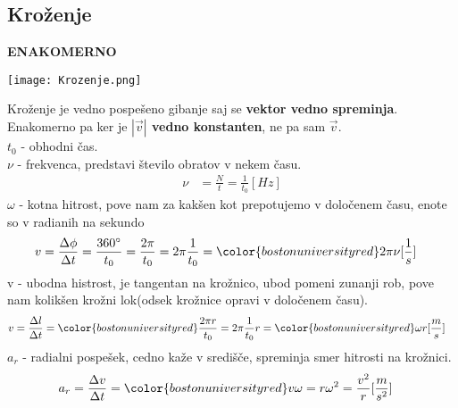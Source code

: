 {\color{indiagreen}\subsection{Kroženje}}
\textbf{ENAKOMERNO}
\begin{center}
	\texttt{[image: Krozenje.png]}
\end{center}
Kroženje je vedno pospešeno gibanje saj se \textbf{vektor vedno spreminja}. Enakomerno pa ker je \textbf{$|\vec{v}|$ vedno konstanten}, ne pa sam $\vec{v}$.\\
$t_0$ - obhodni čas.\\
$\nu$ - frekvenca, predstavi število obratov v nekem času.\\
\begin{align*}
	\nu &= \frac{N}{t} = \frac{1}{t_0} [Hz] 
\end{align*}
$\omega$ - kotna hitrost, pove nam za kakšen kot prepotujemo v določenem času, enote so v radianih na sekundo\\
\begin{align*}
	v &= \frac{\Delta \phi}{\Delta t} = \frac{360^{\circ}}{t_0} = \frac{2\pi}{t_0} = 2\pi\frac{1}{t_0} = {\color{bostonuniversityred}2\pi\nu} [\frac{1}{s}] 
\end{align*}
v - ubodna histrost, je tangentan na krožnico, ubod pomeni zunanji rob, pove nam kolikšen krožni lok(odsek krožnice opravi v določenem času).\\
\begin{align*}
	v &= \frac{\Delta l}{\Delta t} = {\color{bostonuniversityred}\frac{2\pi r}{t_0}} = 2\pi \frac{1}{t_0} r = {\color{bostonuniversityred}\omega r} [\frac{m}{s}] 
\end{align*}
$a_r$ - radialni pospešek, cedno kaže v središče, spreminja smer hitrosti na krožnici.\\
\begin{align*}
	a_r &= \frac{\Delta v}{\Delta t} = {\color{bostonuniversityred}v\omega = r\omega^2 = \frac{v^2}{r}} [\frac{m}{s^2}] 
\end{align*}
